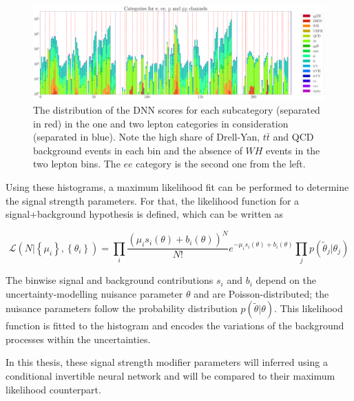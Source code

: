 \begin{figure}[h]
	\centering
	\includegraphics[width=1.1\linewidth]{figures/analysis/cond4_notOrdered.pdf}
	\caption{The distribution of the DNN scores for each subcategory (separated in red) in the one and two lepton categories in consideration (separated in blue). Note the high share of Drell-Yan, $t\bar{t}$ and QCD background events in each bin and the absence of $WH$ events in the two lepton bins. The $ee$ category is the second one from the left.}
	\label{fig:conditions}
\end{figure}


Using these histograms, a maximum likelihood fit can be performed to determine the signal strength parameters. For that, the likelihood function for a signal+background hypothesis is defined, which can be written as

\begin{equation*}
	\mathcal{L}(N | \left\{\mu_i\right\} , \left\{\theta_i\right\}) = \prod\limits_i \frac{(\mu_is_i(\theta)+b_i(\theta))^N}{N!}e^{-\mu_is_i(\theta) + b_i(\theta)} \prod\limits_j p(\tilde{\theta}_j | \theta_j)
\end{equation*}

The binwise signal and background contributions $s_i$ and $b_i$ depend on the uncertainty-modelling nuisance parameter $\theta$ and are Poisson-distributed; the nuisance parameters follow the probability distribution $p(\tilde{\theta} | \theta)$. This likelihood function is fitted to the histogram and encodes the variations of the background processes within the uncertainties.

In this thesis, these signal strength modifier parameters will inferred using a conditional invertible neural network and will be compared to their maximum likelihood counterpart.